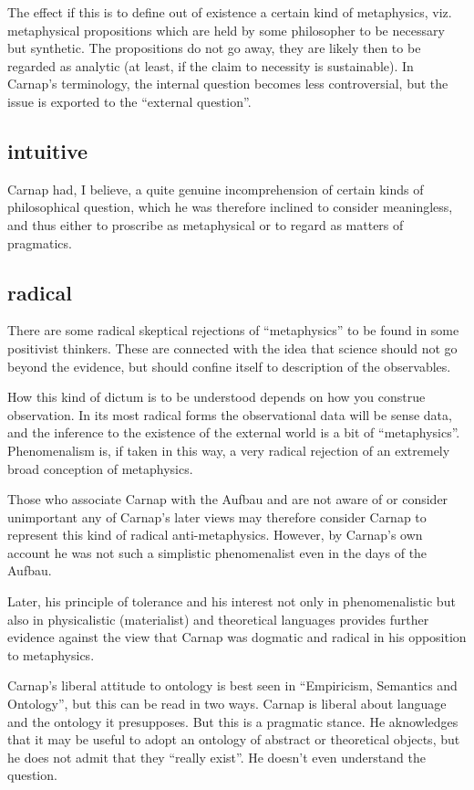 \documentclass[10pt,titlepage]{book}
\begin{document}
The effect if this is to define out of existence a certain kind of metaphysics, viz. metaphysical propositions which are held by some philosopher to be necessary but synthetic.
The propositions do not go away, they are likely then to be regarded as analytic (at least, if the claim to necessity is sustainable).
In Carnap's terminology, the internal question becomes less controversial, but the issue is exported to the ``external question''.

\subsection{intuitive}
Carnap had, I believe, a quite genuine incomprehension of certain kinds of philosophical question, which he was therefore inclined to consider meaningless, and thus either to proscribe as metaphysical or to regard as matters of pragmatics.

\subsection{radical}
There are some radical skeptical rejections of ``metaphysics'' to be found in some positivist thinkers.
These are connected with the idea that science should not go beyond the evidence, but should confine itself to description of the observables.

How this kind of dictum is to be understood depends on how you construe observation.
In its most radical forms the observational data will be sense data, and the inference to the existence of the external world is a bit of ``metaphysics''.
Phenomenalism is, if taken in this way, a very radical rejection of an extremely broad conception of metaphysics.

Those who associate Carnap with the Aufbau and are not aware of or consider unimportant any of Carnap's later views may therefore consider Carnap to represent this kind of radical anti-metaphysics.
However, by Carnap's own account he was not such a simplistic phenomenalist even in the days of the Aufbau.

Later, his principle of tolerance and his interest not only in phenomenalistic but also in physicalistic (materialist) and theoretical languages provides further evidence against the view that Carnap was dogmatic and radical in his opposition to metaphysics.

Carnap's liberal attitude to ontology is best seen in ``Empiricism, Semantics and Ontology'', but this can be read in two ways.
Carnap is liberal about language and the ontology it presupposes.
But this is a pragmatic stance.
He aknowledges that it may be useful to adopt an ontology of abstract or theoretical objects, but he does not admit that they ``really exist''.
He doesn't even understand the question.
\end{document}
